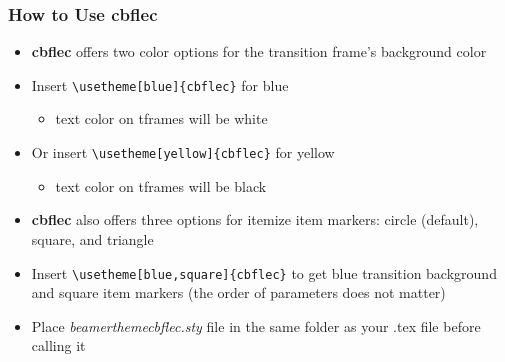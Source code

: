 \documentclass[11pt, aspectratio=43]{beamer}
\begin{document}
\begin{frame}[fragile]
    \frametitle{How to Use \textbf{cbflec}}
    \begin{itemize}
        \item \textbf{cbflec} offers two color options for the transition frame's background color
        \item Insert \verb!\usetheme[blue]{cbflec}! for blue
        \begin{itemize}
            \item text color on tframes will be white
        \end{itemize}
        \item Or insert \verb|\usetheme[yellow]{cbflec}| for yellow
        \begin{itemize}
            \item text color on tframes will be black
        \end{itemize}
        \item \textbf{cbflec} also offers three options for itemize item markers: circle (default), square, and triangle
        \item Insert \verb!\usetheme[blue,square]{cbflec}! to get blue transition background and square item markers (the order of parameters does not matter)
        \item Place \textit{beamerthemecbflec.sty} file in the same folder as your .tex file before calling it
    \end{itemize}
\end{frame}
\end{document}

